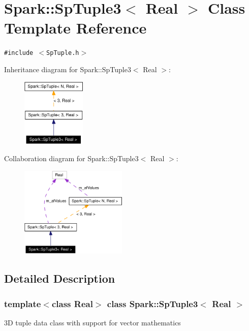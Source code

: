 \section{Spark::Sp\-Tuple3$<$ Real $>$ Class Template Reference}
\label{classSpark_1_1SpTuple3}
{\tt \#include $<$Sp\-Tuple.h$>$}

Inheritance diagram for Spark::Sp\-Tuple3$<$ Real $>$:\begin{figure}[H]
\begin{center}
\leavevmode
\includegraphics[width=86pt]{classSpark_1_1SpTuple3__inherit__graph}
\end{center}
\end{figure}
Collaboration diagram for Spark::Sp\-Tuple3$<$ Real $>$:\begin{figure}[H]
\begin{center}
\leavevmode
\includegraphics[width=144pt]{classSpark_1_1SpTuple3__coll__graph}
\end{center}
\end{figure}


\subsection{Detailed Description}
\subsubsection*{template$<$class Real$>$ class Spark::Sp\-Tuple3$<$ Real $>$}

3D tuple data class with support for vector mathematics 

